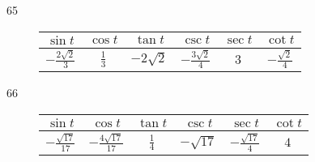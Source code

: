 \documentclass{exam}
\begin{document}
\begin{description}
      \item[65]
        \begin{tabular}[H]{cccccc}
          \toprule
          $\sin t$                 & $\cos t$      & $\tan t$       & $\csc t$                 & $\sec t$ & $\cot t$ \\
          \midrule
          $- \frac{2 \sqrt{2}}{3}$ & $\frac{1}{3}$ & $- 2 \sqrt{2}$ & $- \frac{3 \sqrt{2}}{4}$ & $3$      & $- \frac{\sqrt{2}}{4}$ \\
          \bottomrule
        \end{tabular}

      \item[66]
        \begin{tabular}[H]{cccccc}
          \toprule
          $\sin t$                & $\cos t$                  & $\tan t$      & $\csc t$     & $\sec t$               & $\cot t$ \\
          \midrule
          $-\frac{\sqrt{17}}{17}$ & $-\frac{4 \sqrt{17}}{17}$ & $\frac{1}{4}$ & $-\sqrt{17}$ & $-\frac{\sqrt{17}}{4}$ & $4$ \\
          \bottomrule
        \end{tabular}






\end{description}
\end{document}
